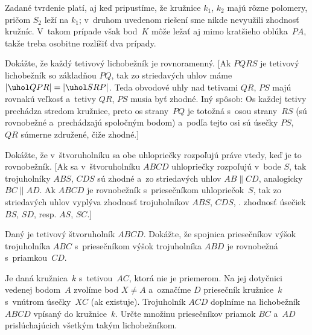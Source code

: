 {\poznamka
Zadané tvrdenie platí, aj keď pripustíme, že kružnice $k_1$, $k_2$ majú rôzne polomery, pričom $S_2$ leží na $k_1$; v~druhom uvedenom riešení sme nikde nevyužili zhodnosť kružníc. V~takom prípade však bod~$K$ môže ležať aj mimo kratšieho oblúka~$PA$, takže treba osobitne rozlíšiť dva prípady.

Dokážte, že každý tetivový lichobežník je rovnoramenný. [Ak $PQRS$ je tetivový lichobežník so základňou $PQ$, tak zo striedavých uhlov máme $|\uhol QPR|=|\uhol SRP|$. Teda obvodové uhly nad tetivami $QR$, $PS$ majú rovnakú veľkosť a~tetivy $QR$, $PS$ musia byť zhodné. Iný spôsob: Os každej tetivy prechádza stredom kružnice, preto os strany~$PQ$ je totožná s~osou strany~$RS$ (sú rovnobežné a~prechádzajú spoločným bodom) a~podľa tejto osi sú úsečky $PS$, $QR$ súmerne združené, čiže zhodné.]

Dokážte, že v~štvoruholníku sa obe uhlopriečky rozpoľujú práve vtedy, keď je to rovnobežník. [Ak sa v~štvoruholníku $ABCD$ uhlopriečky rozpoľujú v~bode $S$, tak trojuholníky $ABS$, $CDS$ sú zhodné a~zo striedavých uhlov $AB\parallel CD$, analogicky $BC\parallel AD$. Ak $ABCD$ je rovnobežník s~priesečníkom uhlopriečok~$S$, tak zo striedavých uhlov vyplýva zhodnosť trojuholníkov $ABS$, $CDS$, \tj. zhodnosť úsečiek $BS$, $SD$, resp. $AS$, $SC$.]

\D
Daný je tetivový štvoruholník $ABCD$. Dokážte, že spojnica priesečníkov výšok trojuholníka $ABC$ s~priesečníkom výšok trojuholníka $ABD$ je rovnobežná s~priamkou~$CD$.
\vpravo{[58--A--I--2]}

Je daná kružnica~$k$ s~tetivou~$AC$, ktorá nie je priemerom. Na jej dotyčnici vedenej bodom~$A$ zvolíme bod $X\ne A$ a~označíme $D$ priesečník kružnice~$k$ s~vnútrom úsečky~$XC$ (ak existuje). Trojuholník $ACD$ doplníme na lichobežník $ABCD$ vpísaný do kružnice~$k$. Určte množinu priesečníkov priamok $BC$ a~$AD$ prislúchajúcich všetkým takým lichobežníkom.
\vpravo{[59--A--III--4]}
}

